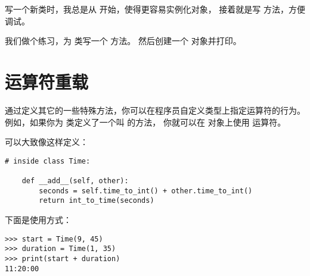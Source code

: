 写一个新类时，我总是从  开始，使得更容易实例化对象，
接着就是写  方法，方便调试。


我们做个练习，为  类写一个  方法。
然后创建一个  对象并打印。

\section{运算符重载}
\label{operator.overloading}


通过定义其它的一些特殊方法，你可以在程序员自定义类型上指定运算符的行为。
例如，如果你为  类定义了一个叫  的方法，
你就可以在  对象上使用 \li{+} 运算符。

  


可以大致像这样定义：

  

\begin{lstlisting}
# inside class Time:

    def __add__(self, other):
        seconds = self.time_to_int() + other.time_to_int()
        return int_to_time(seconds)
\end{lstlisting}

%

下面是使用方式：

\begin{lstlisting}
>>> start = Time(9, 45)
>>> duration = Time(1, 35)
>>> print(start + duration)
11:20:00
\end{lstlisting}

%

